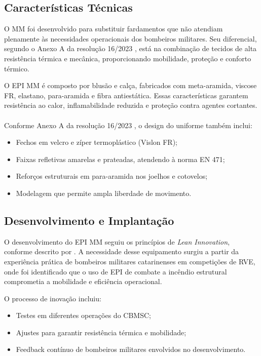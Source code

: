 \subsection{Características Técnicas}

O \acrlong{MM} foi desenvolvido para substituir fardamentos que não atendiam plenamente 
às necessidades operacionais dos bombeiros militares. Seu diferencial, segundo o Anexo A 
da resolução 16/2023 \cite{res16}, está na combinação de tecidos de alta resistência térmica e 
mecânica, proporcionando mobilidade, proteção e conforto térmico.

O \acrshort{EPI} \acrshort{MM} é composto por blusão e calça, fabricados com meta-aramida, viscose FR, elastano, 
para-aramida e fibra antiestática. Essas características garantem resistência ao calor, 
inflamabilidade reduzida e proteção contra agentes cortantes. 
\\\\
Conforme Anexo A da resolução 16/2023 \cite{res16}, o design do uniforme também inclui:
\begin{itemize}
    \item Fechos em velcro e zíper termoplástico (Vislon FR);
    \item Faixas refletivas amarelas e prateadas, atendendo à norma EN 471;
    \item Reforços estruturais em para-aramida nos joelhos e cotovelos;
    \item Modelagem que permite ampla liberdade de movimento.
\end{itemize}

\begin{centering}
\end{centering}

\subsection{Desenvolvimento e Implantação}

O desenvolvimento do \acrshort{EPI} \acrlong{MM} seguiu os princípios de \textit{Lean Innovation}, 
conforme descrito por \textcite{Melina2023}. A necessidade desse equipamento surgiu a partir 
da experiência prática de bombeiros militares catarinenses em competições de \acrfull{RVE}, 
onde foi identificado que o uso de \acrshort{EPI} de combate a incêndio estrutural 
comprometia a mobilidade e eficiência operacional.

O processo de inovação incluiu:
\begin{itemize}
    \item Testes em diferentes operações do \acrshort{CBMSC};
    \item Ajustes para garantir resistência térmica e mobilidade;
    \item Feedback contínuo de bombeiros militares envolvidos no desenvolvimento.
\end{itemize}

